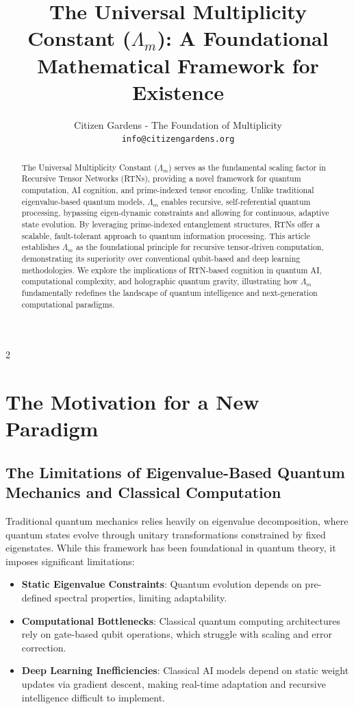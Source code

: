 \documentclass{article}
\title{\textbf{The Universal Multiplicity Constant ($\Lambda_m$)}: \newline A Foundational Mathematical Framework for Existence}
\author{Citizen Gardens - The Foundation of Multiplicity \\ \texttt{info@citizengardens.org}}
\theoremstyle{plain}
\begin{document}
\maketitle
\nolinenumbers
\begin{abstract}
The Universal Multiplicity Constant ($\Lambda_m$) serves as the fundamental scaling factor in Recursive Tensor Networks (RTNs), providing a novel framework for quantum computation, AI cognition, and prime-indexed tensor encoding. Unlike traditional eigenvalue-based quantum models, $\Lambda_m$ enables recursive, self-referential quantum processing, bypassing eigen-dynamic constraints and allowing for continuous, adaptive state evolution. By leveraging prime-indexed entanglement structures, RTNs offer a scalable, fault-tolerant approach to quantum information processing. This article establishes $\Lambda_m$ as the foundational principle for recursive tensor-driven computation, demonstrating its superiority over conventional qubit-based and deep learning methodologies. We explore the implications of RTN-based cognition in quantum AI, computational complexity, and holographic quantum gravity, illustrating how $\Lambda_m$ fundamentally redefines the landscape of quantum intelligence and next-generation computational paradigms.
\end{abstract}

\begin{multicols}{2}
\begin{singlespace}
\tableofcontents
\end{singlespace}
\end{multicols}

\linenumbers
\section{The Motivation for a New Paradigm}

\subsection{The Limitations of Eigenvalue-Based Quantum Mechanics and Classical Computation}

Traditional quantum mechanics relies heavily on eigenvalue decomposition, where quantum states evolve through unitary transformations constrained by fixed eigenstates. While this framework has been foundational in quantum theory, it imposes significant limitations:
\begin{itemize}
    \item \textbf{Static Eigenvalue Constraints}: Quantum evolution depends on pre-defined spectral properties, limiting adaptability.
    \item \textbf{Computational Bottlenecks}: Classical quantum computing architectures rely on gate-based qubit operations, which struggle with scaling and error correction.
    \item \textbf{Deep Learning Inefficiencies}: Classical AI models depend on static weight updates via gradient descent, making real-time adaptation and recursive intelligence difficult to implement.
\end{itemize}
\end{document}
